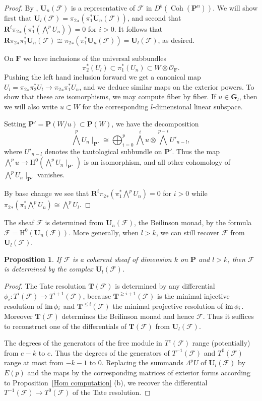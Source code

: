 \documentclass{jams-l}
\newtheorem{proposition}[theorem]{Proposition}
\theoremstyle{definition}
\theoremstyle{remark}
\newcommand{\F}{{\mathcal F}}
\newcommand{\FF}{{\mathbf F}}
\newcommand{\GG}{{\mathbf G}}
\newcommand{\Hrm}{{\mathrm H}}
\newcommand{\Ocal}{{\mathcal O}}
\newcommand{\PP}{{\mathbf P}}
\newcommand{\RR}{{\mathbf R}}
\newcommand{\TT}{{\mathbf T}}
\newcommand{\UU}{{\mathbf U}}
\newcommand{\im}{\mathop{\rm im}}
\newcommand{\coh}{{\operatorname{Coh}}}
\begin{document}
\begin{proof} 
By \cite[Theorem 6.1]{Eisenbudetal.2001},
$\UU_n(\F)$ is a representative of $\F$ in $D^b(\coh(\PP^n))$.
We will show first that $\UU_l(\F)={\pi_2}_*(\pi_1^* \UU_n(\F))$,
and second that $\RR^i{\pi_2}_*(\pi_1^*(\bigwedge^pU_n))=0$ for $i>0$.
It follows 
that 
${\RR\pi_2}_*\pi_1^* \UU_n(\F)\cong {\pi_2}_*(\pi_1^* \UU_n(\F))
=\UU_l(\F)$,
as desired.

On $\FF$ we have inclusions of the universal subbundles
\[
\pi_2^*(U_l)\subset \pi_1^*(U_n)\subset W\otimes \Ocal_\FF.
\]
Pushing the left hand inclusion forward we get a canonical map
$U_l={\pi_2}_*\pi_2^*U_l \to {\pi_2}_*\pi_1^*U_n$, 
and we deduce similar maps on the exterior powers.
To show that these are isomorphisms, we may compute fiber by
fiber.
If $u \in \GG_l$, then we will also write
$u \subset W$ for the corresponding $l$-dimensional linear subspace.

Setting $\PP'=\PP(W/u)\subset \PP(W)$,
we have the decomposition
\[
\bigwedge^pU_n \mid_{\PP'} \cong
\bigoplus_{i=0}^p
\bigwedge^iu
\otimes
\bigwedge^{p-i}U'_{n-l},
\]
where $U'_{n-l}$ denotes the tautological subbundle on $\PP'$.
Thus the map $\bigwedge^pu\to \Hrm^0(\bigwedge^pU_n\mid_{\PP'})$
is an isomorphism, and all other cohomology of
$\bigwedge^pU_n\mid_{\PP'}$ vanishes.

{}By base change
\cite[III.12]{Hartshorne 1977} we see that
$\RR^i{\pi_2}_*(\pi_1^*\bigwedge^pU_n)=0$ for $i>0$ while
${\pi_2}_*(\pi_1^*\bigwedge^pU_n) \cong \bigwedge^p U_l$.
\end{proof}

The sheaf $\F$ is determined from $\UU_n(\F)$, the Beilinson
monad, by the formula $\F=\Hrm^0(\UU_n(\F))$. 
More generally, when $l>k$, we can still recover $\F$ from
$\UU_l(\F)$.

\begin{proposition}\label{determine F} If $\F$ is a coherent sheaf of 
dimension $k$ on $\PP$ and $l>k$, then $\F$ is determined
by the complex $\UU_l(\F)$.
\end{proposition}

\begin{proof}
The Tate resolution $\TT(\F)$ is determined by any differential 
$\phi_i: T^i(\F)\to T^{i+1}(\F)$, because $\TT^{\ge i+1}(\F)$ 
is the minimal 
injective resolution of $\im \phi_i$ and $\TT^{\le i}(\F)$ 
the minimal projective resolution of  $\im \phi_i$. 
Moreover $\TT(\F)$ determines the Beilinson monad and
hence $\F$. Thus it suffices to reconstruct one of the differentials
of $\TT(\F)$ from $\UU_l(\F)$.


The degrees of the generators of the free module in $T^e(\F)$
range (potentially) from $e-k$ to $e$. Thus the degrees of the
generators of $T^{-1}(\F)$ and $T^{0}(\F)$ range at most from 
$-k-1$ to 0. Replacing the summands $\Lambda^p U$ of $\UU_l(\F)$ by $E(p)$ 
and the maps by the corresponding matrices of exterior forms according to
Proposition~\ref{Hom computation} (b), we recover the differential
$T^{-1}(\F) \to T^0(\F)$ of the Tate resolution.
\end{proof}
\end{document}
